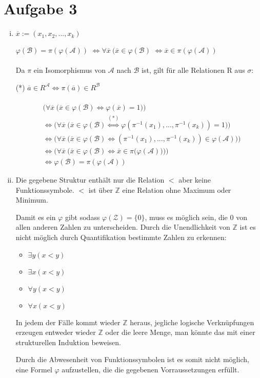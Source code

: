\documentclass[a4paper,10pt]{article}
\newcommand{\Z}{\mathbb{Z}}
\begin{document}
\section*{Aufgabe 3}
\begin{enumerate}[(i)]
\item
$\overline{x} := (x_1,x_2,...,x_k)$

$\varphi(\mathcal{B}) = \pi(\varphi(\mathcal{A}))$
$\Leftrightarrow \forall \overline{x}~ (\overline{x} \in \varphi(\mathcal{B})$
$\Leftrightarrow \overline{x} \in \pi(\varphi(\mathcal{A}))$
\\
\\
Da $\pi$ ein Isomorphismus von $\mathcal{A}$ nach $\mathcal{B}$ ist, gilt für alle Relationen R aus $\sigma$: 

(*) $\overline{a} \in R^{\mathcal{A}} \Leftrightarrow \pi(\overline{a}) \in R^{\mathcal{B}}$
\\
\\
\begin{align*}
&\big(\forall \overline{x}~ \big( \overline{x} \in \varphi(\mathcal{B})  \Leftrightarrow \varphi(\overline{x}) =1\big)\big) \\
&\Leftrightarrow \big(\forall \overline{x}~ \big( \overline{x} \in \varphi(\mathcal{B})  \overset{(*)}{\Leftrightarrow} \varphi(\pi^{-1}(x_1),...,\pi^{-1}(x_k)) = 1\big)\big) \\
&\Leftrightarrow \big(\forall \overline{x}~ \big( \overline{x} \in \varphi(\mathcal{B})  \Leftrightarrow (\pi^{-1}(x_1),...,\pi^{-1}(x_k)) \in \varphi(\mathcal{A}))\big) \\ 
&\Leftrightarrow \big(\forall \overline{x}~ \big( \overline{x} \in \varphi(\mathcal{B})  \Leftrightarrow \overline{x} \in \pi(\varphi(\mathcal{A}) \big)\big)\big) \\
&\Leftrightarrow \varphi(\mathcal{B}) = \pi(\varphi(\mathcal{A}))
\end{align*}


\item
Die gegebene Struktur enthält nur die Relation $<$ aber keine Funktionssymbole. 
$<$ ist über $\mathbb{Z}$ eine Relation ohne Maximum oder Minimum. 

Damit es ein $\varphi$ gibt sodass $\varphi(\mathcal{Z}) = \lbrace 0 \rbrace$, muss es möglich sein, die $0$ von allen anderen Zahlen zu unterscheiden. Durch die Unendlichkeit von $\mathbb{Z}$ ist es nicht möglich durch Quantifikation bestimmte Zahlen zu erkennen:
\begin{itemize}
\item
$\exists y (x < y)$
\item
$\exists x (x < y)$
\item
$\forall y (x < y)$
\item
$\forall x (x < y)$
\end{itemize}
In jedem der Fälle kommt wieder $\Z$ heraus, jegliche logische Verknüpfungen erzeugen entweder wieder $\Z$ oder die leere Menge, man könnte das mit einer strukturellen Induktion beweisen.

Durch die Abwesenheit von Funktionssymbolen ist es somit nicht möglich, eine Formel $\varphi$ aufzustellen, die die gegebenen Vorraussetzungen erfüllt.


\end{enumerate}
\end{document}
